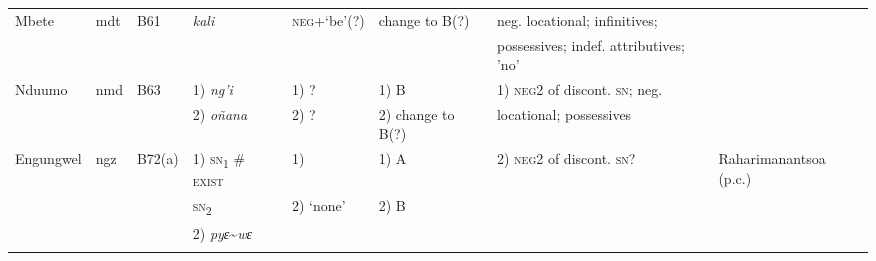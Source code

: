 \documentclass[output=paper,draft,draftmode,colorlinks,citecolor=brown]{langscibook}
\begin{document}
\begin{paperappendix}
\begin{sidewaystable}[p]
\begin{tabularx}{\textwidth}{llllllQQ}
{Mbete} 	&{mdt} 	&{B61} 	&\textit{kali} 	&\textsc{neg}+`be'(?) 					&change to B(?) 	&neg. locational; infinitives;			&\citet{Adam1954}\\
				&				&				&				&										&		&possessives; indef. attributives; 'no'		&\\
{Nduumo} &{nmd} 	& {B63} 	&1) \textit{ng'i}	& 1) ?									&1) B	&1) \textsc{neg}2 of discont. \textsc{sn}; neg.	&\citet{Adam1954}\\
				&				&				&2) \textit{o\~n{}ana} &2) ?									&2) change to B(?)	&locational; possessives 				&\\
{Engungwel} & {ngz} &{B72(a)} 	&1) \textsc{sn}\textsubscript{1} \# \textsc{exist}& 1) \textendash	&1) A&2) \textsc{neg}2 of discont. \textsc{sn}?&Raharimanantsoa (p.c.)\\
				&				&				&\textsc{sn}\textsubscript{2}&2) `none'							&2) B&						&\\
				&				&				&2) \textit{pyɛ}{\textasciitilde}\textit{wɛ}&					&		&									&\\
\lspbottomrule
\end{tabularx}
\end{sidewaystable}


\end{paperappendix}
\end{document}
